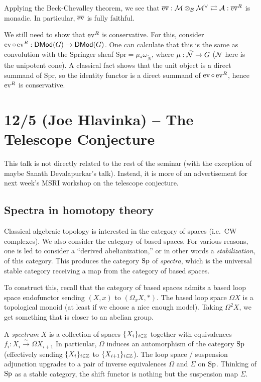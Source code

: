 \documentclass{article}
\begin{document}
Applying the Beck-Chevalley theorem, we see that $\overline{\operatorname{ev}}: \mathcal{M} \otimes_{\mathcal{B}} \mathcal{M}^\vee \rightleftarrows \mathcal{A} : \overline{\operatorname{ev}}^R$ is monadic.
In particular, $\overline{\operatorname{ev}}$ is fully faithful.

We still need to show that $\operatorname{ev}^R$ is conservative.
For this, consider $\operatorname{ev} \circ \operatorname{ev}^R: \mathsf{DMod}(G) \to \mathsf{DMod}(G)$.
One can calculate that this is the same as convolution with the Springer sheaf $\mathrm{Spr} = \mu_* \omega_{\tilde{N}}$, where $\mu: \tilde{\mathcal{N}} \to G$ ($\mathcal{N}$ here is the unipotent cone).
A classical fact shows that the unit object is a direct summand of $\mathrm{Spr}$, so the identity functor is a direct summand of $\operatorname{ev} \circ \operatorname{ev}^R$, hence $\operatorname{ev}^R$ is conservative.

\section{12/5 (Joe Hlavinka) -- The Telescope Conjecture}

This talk is not directly related to the rest of the seminar (with the exception of maybe Sanath Devalapurkar's talk).
Instead, it is more of an advertisement for next week's MSRI workshop on the telescope conjecture.

\subsection{Spectra in homotopy theory}

Classical algebraic topology is interested in the category of spaces (i.e.\ CW complexes).
We also consider the category of based spaces.
For various reasons, one is led to consider a ``derived abelianization,'' or in other words a \emph{stabilization}, of this category.
This produces the category $\operatorname{Sp}$ of \emph{spectra}, which is the universal stable category receiving a map from the category of based spaces.

To construct this, recall that the category of based spaces admits a based loop space endofunctor sending $(X, x)$ to $(\Omega_x X, *)$.
The based loop space $\Omega X$ is a topological monoid (at least if we choose a nice enough model).
Taking $\Omega^2 X$, we get something that is closer to an abelian group.

A \emph{spectrum} $X$ is a collection of spaces $\{ X_i \}_{i \in \mathbb{Z}}$ together with equivalences $f_i: X_i \xrightarrow{\sim} \Omega X_{i+1}$
In particular, $\Omega$ induces an automorphism of the category $\operatorname{Sp}$ (effectively sending $\{ X_i \}_{i \in \mathbb{Z}}$ to $\{ X_{i+1} \}_{i \in \mathbb{Z}}$).
The loop space / suspension adjunction upgrades to a pair of inverse equivalences $\Omega$ and $\Sigma$ on $\operatorname{Sp}$.
Thinking of $\operatorname{Sp}$ as a stable category, the shift functor is nothing but the suspension map $\Sigma$.
\end{document}

